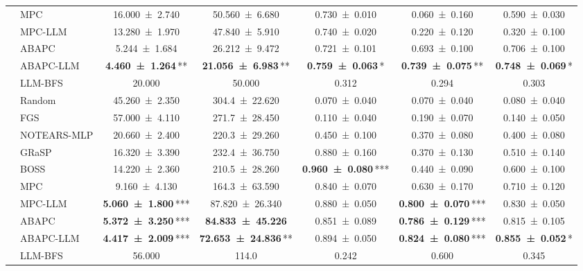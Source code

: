 \begin{table}[t]
{\begin{tabular}{llccccc}
     & MPC & \num{16.000 +- 2.740} & \num{50.560 +- 6.680} & \num{0.730 +- 0.010} & \num{0.060 +- 0.160} & \num{0.590 +- 0.030} \\
     & MPC-LLM & \num{13.280 +- 1.970} & \num{47.840 +- 5.910} & \num{0.740 +- 0.020} & \num{0.220 +- 0.120} & \num{0.320 +- 0.100} \\
     & ABAPC & \num{5.244 +- 1.684} & \num{26.212 +- 9.472} & \num{0.721 +- 0.101} & \num{0.693 +- 0.100} & \num{0.706 +- 0.100} \\
     & ABAPC-LLM & {\bfseries \num{4.460 +- 1.264}}\,\textnormal{**} & {\bfseries \num{21.056 +- 6.983}}\,\textnormal{**} & {\bfseries \num{0.759 +- 0.063}}\,\textnormal{*} & {\bfseries \num{0.739 +- 0.075}}\,\textnormal{**} & {\bfseries \num{0.748 +- 0.069}}\,\textnormal{*} \\
     & LLM-BFS & \num{20.000} & \num{50.000} & \num{0.312} & \num{0.294} & \num{0.303} \\
    \midrule
     & Random & \num{45.260 +- 2.350} & \num{304.4 +- 22.620} & \num{0.070 +- 0.040} & \num{0.070 +- 0.040} & \num{0.080 +- 0.040} \\
     & FGS & \num{57.000 +- 4.110} & \num{271.7 +- 28.450} & \num{0.110 +- 0.040} & \num{0.190 +- 0.070} & \num{0.140 +- 0.050} \\
     & NOTEARS-MLP & \num{20.660 +- 2.400} & \num{220.3 +- 29.260} & \num{0.450 +- 0.100} & \num{0.370 +- 0.080} & \num{0.400 +- 0.080} \\
     & GRaSP & \num{16.320 +- 3.390} & \num{232.4 +- 36.750} & \num{0.880 +- 0.160} & \num{0.370 +- 0.130} & \num{0.510 +- 0.140} \\
     & BOSS & \num{14.220 +- 2.360} & \num{210.5 +- 28.260} & {\bfseries \num{0.960 +- 0.080}}\,\textnormal{***} & \num{0.440 +- 0.090} & \num{0.600 +- 0.100} \\
     & MPC & \num{9.160 +- 4.130} & \num{164.3 +- 63.590} & \num{0.840 +- 0.070} & \num{0.630 +- 0.170} & \num{0.710 +- 0.120} \\
     & MPC-LLM & {\bfseries \num{5.060 +- 1.800}}\,\textnormal{***} & \num{87.820 +- 26.340} & \num{0.880 +- 0.050} & {\bfseries \num{0.800 +- 0.070}}\,\textnormal{***} & \num{0.830 +- 0.050} \\
     & ABAPC & {\bfseries \num{5.372 +- 3.250}}\,\textnormal{***} & {\bfseries \num{84.833 +- 45.226}} & \num{0.851 +- 0.089} & {\bfseries \num{0.786 +- 0.129}}\,\textnormal{***} & \num{0.815 +- 0.105} \\
     & ABAPC-LLM & {\bfseries \num{4.417 +- 2.009}}\,\textnormal{***} & {\bfseries \num{72.653 +- 24.836}}\,\textnormal{**} & \num{0.894 +- 0.050} & {\bfseries \num{0.824 +- 0.080}}\,\textnormal{***} & {\bfseries \num{0.855 +- 0.052}}\,\textnormal{*} \\
     & LLM-BFS & \num{56.000} & \num{114.0} & \num{0.242} & \num{0.600} & \num{0.345} \\
    \bottomrule
    \end{tabular}
    }
\end{table}
